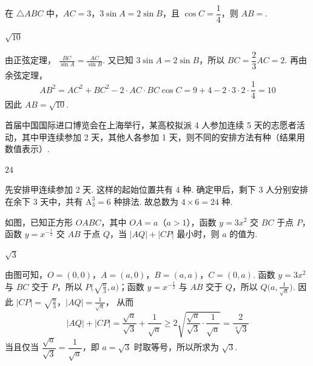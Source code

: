 \begin{problem}
在 \(\triangle ABC\) 中，\(AC=3\)，\(3\sin A=2\sin B\)，且 \(\cos C=\dfrac14\)，则 \(AB=\)\fillinblank{}.
\end{problem}

\begin{answer}
\(\sqrt{10}\)
\end{answer}

\begin{solution}
由正弦定理，
\(\frac{BC}{\sin A}=\frac{AC}{\sin B}\).
又已知 \(3\sin A=2\sin B\)，所以 \(BC=\dfrac23AC=2\). 再由余弦定理，
\[
AB^2=AC^2+BC^2-2\cdot AC\cdot BC\cos C
=9+4-2\cdot3\cdot2\cdot\dfrac14=10
\]
因此 \(AB=\sqrt{10}\).
\end{solution}

\begin{problem}
首届中国国际进口博览会在上海举行，某高校拟派 4 人参加连续 5 天的志愿者活动，其中甲连续参加 2 天，其他人各参加 1 天，则不同的安排方法有\fillinblank{}种（结果用数值表示）.
\end{problem}

\begin{answer}
\(24\)
\end{answer}

\begin{solution}
先安排甲连续参加 2 天. 这样的起始位置共有 4 种. 确定甲后，剩下 3 人分别安排在余下 3 天中，共有 \(\mathrm A_3^3=6\) 种排法. 故总数为 \(4\times 6=24\) 种.
\end{solution}

\begin{problem}
如图，已知正方形 \(OABC\)，其中 \(OA=a\)（\(a>1\)），函数 \(y=3x^2\) 交 \(BC\) 于点 \(P\)，函数 \(y=x^{-\frac{1}{2}}\) 交 \(AB\) 于点 \(Q\)，当 \(|AQ|+|CP|\) 最小时，则 \(a\) 的值为\fillinblank{}.

\end{problem}

\begin{answer}
\(\sqrt3\)
\end{answer}

\begin{solution}
由图可知，\(O=(0,0)\)，\(A=(a,0)\)，\(B=(a,a)\)，\(C=(0,a)\). 函数 \(y=3x^2\) 与 \(BC\) 交于 \(P\)，所以 \(P\bigl(\sqrt{\frac{a}{3}},a\bigr)\)；函数 \(y=x^{-\frac{1}{2}}\) 与 \(AB\) 交于 \(Q\)，所以 \(Q\bigl(a,\frac{1}{\sqrt a}\bigr)\). 因此
\(|CP|=\sqrt{\frac a3}\)，\(|AQ|=\frac1{\sqrt a}\)，
从而
\[
|AQ|+|CP|=\frac{\sqrt a}{\sqrt3}+\frac1{\sqrt a}\ge 2\sqrt{\frac{\sqrt a}{\sqrt3}\cdot\frac1{\sqrt a}}=\frac{2}{\sqrt[4]{3}}
\]
当且仅当 \(\dfrac{\sqrt a}{\sqrt3}=\dfrac1{\sqrt a}\)，即 \(a=\sqrt3\) 时取等号，所以所求为 \(\sqrt3\).
\end{solution}

